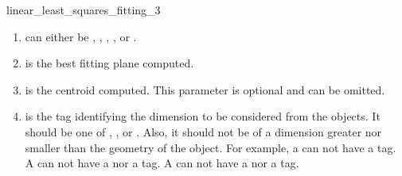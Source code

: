 \begin{ccRefFunction}{linear_least_squares_fitting_3}
\begin{enumerate}
   \item  {} can either be ,
          , , ,
           or .
   \item  {} is the best fitting plane computed.
   \item  {} is the centroid computed. This parameter is optional and can be omitted.
   \item  {} is the tag identifying the dimension to be considered from the objects. It should be one of , ,  or . Also, it should not be of a dimension greater nor smaller than the geometry of the object. For example, a  can not have a  tag. A  can not have a  nor a  tag. A  can not have a  nor a  tag.
\end{enumerate}

\end{ccRefFunction}

